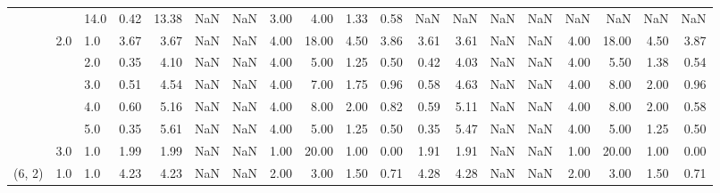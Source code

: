 \begin{tabular}{lllrrrrrrrrrrrrrrrr}
       &     & 14.0 &      0.42 &      13.38 &               NaN &                NaN & 3.00 &   4.00 &             1.33 &                         0.58 &       NaN &        NaN &               NaN &                NaN &  NaN &    NaN &              NaN &                          NaN \\
       & 2.0 & 1.0  &      3.67 &       3.67 &               NaN &                NaN & 4.00 &  18.00 &             4.50 &                         3.86 &      3.61 &       3.61 &               NaN &                NaN & 4.00 &  18.00 &             4.50 &                         3.87 \\
       &     & 2.0  &      0.35 &       4.10 &               NaN &                NaN & 4.00 &   5.00 &             1.25 &                         0.50 &      0.42 &       4.03 &               NaN &                NaN & 4.00 &   5.50 &             1.38 &                         0.54 \\
       &     & 3.0  &      0.51 &       4.54 &               NaN &                NaN & 4.00 &   7.00 &             1.75 &                         0.96 &      0.58 &       4.63 &               NaN &                NaN & 4.00 &   8.00 &             2.00 &                         0.96 \\
       &     & 4.0  &      0.60 &       5.16 &               NaN &                NaN & 4.00 &   8.00 &             2.00 &                         0.82 &      0.59 &       5.11 &               NaN &                NaN & 4.00 &   8.00 &             2.00 &                         0.58 \\
       &     & 5.0  &      0.35 &       5.61 &               NaN &                NaN & 4.00 &   5.00 &             1.25 &                         0.50 &      0.35 &       5.47 &               NaN &                NaN & 4.00 &   5.00 &             1.25 &                         0.50 \\
       & 3.0 & 1.0  &      1.99 &       1.99 &               NaN &                NaN & 1.00 &  20.00 &             1.00 &                         0.00 &      1.91 &       1.91 &               NaN &                NaN & 1.00 &  20.00 &             1.00 &                         0.00 \\
(6, 2) & 1.0 & 1.0  &      4.23 &       4.23 &               NaN &                NaN & 2.00 &   3.00 &             1.50 &                         0.71 &      4.28 &       4.28 &               NaN &                NaN & 2.00 &   3.00 &             1.50 &                         0.71 \\

\end{tabular}

